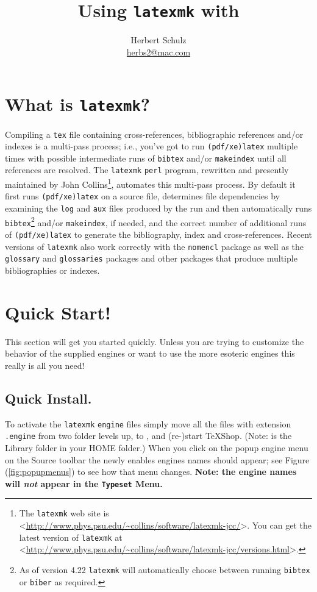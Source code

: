 \documentclass[11pt]{article}
\title{Using \texttt{latexmk} with \TS}
\author{Herbert Schulz\\\small\href{mailto:herbs2@mac.com}{herbs2@mac.com}}
\date{}
\newcommand{\cmd}[1]{\textsf{#1}}
\newcommand{\TS}{\textsf{\TeX Shop}}
\begin{document}
\maketitle
\thispagestyle{empty}
\section{What is \texttt{latexmk}?}
Compiling a \texttt{tex} file containing cross-references, bibliographic references and/or indexes is a multi-pass process; i.e., you've got to run \texttt{(pdf/xe)latex} multiple times with possible intermediate runs of \texttt{bibtex} and/or \texttt{makeindex} until all references are resolved. The \texttt{latexmk} \texttt{perl} program, rewritten and presently maintained by John Collins\footnote{The \texttt{latexmk} web site is <\url{http://www.phys.psu.edu/~collins/software/latexmk-jcc/}>. You can get the latest version of \texttt{latexmk} at <\url{http://www.phys.psu.edu/~collins/software/latexmk-jcc/versions.html}>. }, automates this multi-pass process. By default it first runs \texttt{(pdf/xe)latex} on a source file, determines file dependencies by examining the \texttt{log} and \texttt{aux} files produced by the run and then automatically runs \texttt{bibtex}\footnote{As of version 4.22 \texttt{latexmk} will automatically choose between running \texttt{bibtex} or \texttt{biber} as required.} and/or \texttt{makeindex}, if needed, and the correct number of additional runs of \texttt{(pdf/xe)latex} to generate the bibliography, index and cross-references. Recent versions of \texttt{latexmk} also work correctly with the \texttt{nomencl} package as well as the  \texttt{glossary} and \texttt{glossaries} packages and other packages that produce multiple bibliographies or indexes.

\section{Quick Start!}

This section will get you started quickly. Unless you are trying to customize the behavior of the supplied engines or want to use the more esoteric engines this really is all you need!

\subsection{Quick Install.}

To activate the \texttt{latexmk} \texttt{engine} files simply move all the files with extension \texttt{.engine} from  two folder levels up, to , and (re-)start \TS. (Note:  is the \cmd{Library} folder in your \cmd{HOME} folder.) When you click on the popup engine menu on the Source toolbar the newly enables engines names should appear; see Figure (\ref{fig:popupmenus}) to see how that menu changes. \textbf{Note: the engine names will \emph{not} appear in the \texttt{Typeset} Menu.}
\end{document}
